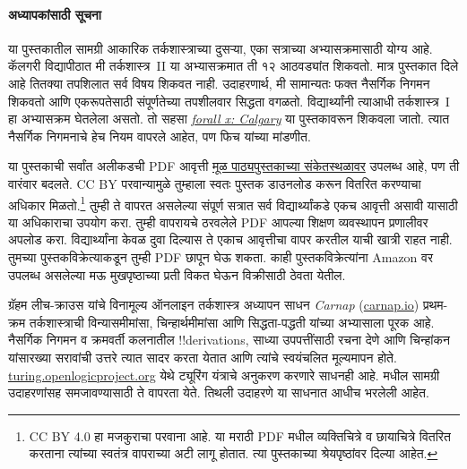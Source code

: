 \paragraph{अध्यापकांसाठी सूचना} या पुस्तकातील सामग्री आकारिक तर्कशास्त्राच्या दुसऱ्या, एका सत्राच्या अभ्यासक्रमासाठी योग्य आहे. कॅलगरी विद्यापीठात मी तर्कशास्त्र~II या अभ्यासक्रमात ती १२ आठवड्यांत शिकवतो. मात्र पुस्तकात दिले आहे तितक्या तपशिलात सर्व विषय शिकवत नाही. उदाहरणार्थ, मी सामान्यतः फक्त नैसर्गिक निगमन शिकवतो आणि एकरूपतेसाठी संपूर्णतेच्या तपशीलवार सिद्धता वगळतो. विद्यार्थ्यांनी त्याआधी तर्कशास्त्र~I हा अभ्यासक्रम घेतलेला असतो. तो सहसा \emph{\href{https://forallx.openlogicproject.org}{forall x: Calgary}} या पुस्तकावरून शिकवला जातो. त्यात नैसर्गिक निगमनाचे हेच नियम वापरले आहेत, पण फिच यांच्या मांडणीत.

या पुस्तकाची सर्वांत अलीकडची PDF आवृत्ती \href{https://slc.openlogicproject.org}{मूळ पाठ्यपुस्तकाच्या संकेतस्थळावर} उपलब्ध आहे, पण ती वारंवार बदलते. CC BY परवान्यामुळे तुम्हाला स्वतः पुस्तक डाउनलोड करून वितरित करण्याचा अधिकार मिळतो.\footnote{CC BY 4.0 हा मजकुराचा परवाना आहे. या मराठी PDF मधील व्यक्तिचित्रे व छायाचित्रे वितरित करताना त्यांच्या स्वतंत्र वापराच्या अटी लागू होतात. त्या पुस्तकाच्या श्रेयपृष्ठांवर दिल्या आहेत.} तुम्ही ते वापरत असलेल्या संपूर्ण सत्रात सर्व विद्यार्थ्यांकडे एकच आवृत्ती असावी यासाठी या अधिकाराचा उपयोग करा. तुम्ही वापरायचे ठरवलेले PDF आपल्या शिक्षण व्यवस्थापन प्रणालीवर अपलोड करा. विद्यार्थ्यांना केवळ दुवा दिल्यास ते एकाच आवृत्तीचा वापर करतील याची खात्री राहत नाही. तुमच्या पुस्तकविक्रेत्याकडून तुम्ही PDF छापून घेऊ शकता. काही पुस्तकविक्रेत्यांना Amazon वर उपलब्ध असलेल्या मऊ मुखपृष्ठाच्या प्रती विकत घेऊन विक्रीसाठी ठेवता येतील.

ग्रॅहम लीच-क्राउस यांचे विनामूल्य ऑनलाइन तर्कशास्त्र अध्यापन साधन \emph{Carnap} (\href{https://carnap.io}{carnap.io}) प्रथम-क्रम तर्कशास्त्राची विन्यासमीमांसा, चिन्हार्थमीमांसा आणि सिद्धता-पद्धती यांच्या अभ्यासाला पूरक आहे. नैसर्गिक निगमन व क्रमवर्ती कलनातील !!{derivation}s, साध्या उपपत्तींसाठी रचना देणे आणि चिन्हांकन यांसारख्या सरावांची उत्तरे त्यात सादर करता येतात आणि त्यांचे स्वयंचलित मूल्यमापन होते. \href{https://turing.openlogicproject.org}{turing.openlogicproject.org} येथे ट्यूरिंग यंत्राचे अनुकरण करणारे साधनही आहे.  मधील सामग्री उदाहरणांसह समजावण्यासाठी ते वापरता येते. तिथली उदाहरणे या साधनात आधीच भरलेली आहेत.
